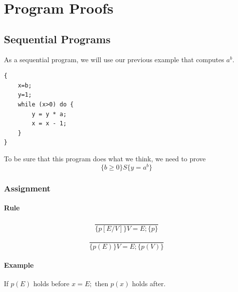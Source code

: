 \documentclass[12pt, a4paper]{book}
\begin{document}

  \chapter{Program Proofs}
  \label{chap:Program Proofs}

  \section{Sequential Programs}
  \label{sec:Sequential Programs}

As a sequential program, we will use our previous example that computes $a^b$.

\begin{lstlisting}[caption={Function computing $a^b$}, captionpos=below]
{
    x=b;
    y=1;
    while (x>0) do {
        y = y * a;
        x = x - 1;
    }
}
\end{lstlisting}

To be sure that this program does what we think, we need to prove
$$
\{ b \ge 0\} S \{ y = a^b \}
$$

    \subsection{Assignment}

    \subsubsection{Rule}

    $$
    \frac{}
    { \{ p[E/V] \} V = E; \{ p \} }
    $$

    $$
    \frac{}
    { \{ p(E) \} V = E ; \{ p(V) \} }
    $$

    \subsubsection{Example}
    If $p(E)$ holds before $x = E;$ then $p(x)$ holds after.
\end{document}
